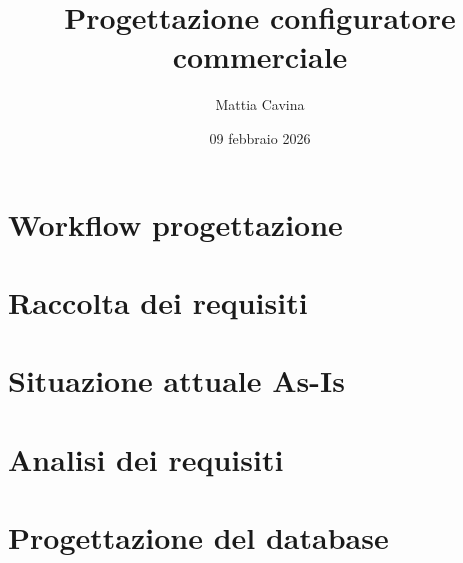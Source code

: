 \documentclass[12pt, a4paper]{article}
\title{Progettazione configuratore commerciale}
\author{Mattia Cavina}
\date{09 febbraio 2026}
\begin{document}
\maketitle
\newpage

\tableofcontents

\begin{abstract}
    
\end{abstract}

\section{Workflow progettazione}


\section{Raccolta dei requisiti}


\section{Situazione attuale As-Is}


\section{Analisi dei requisiti}


\section{Progettazione del database}




\end{document}

